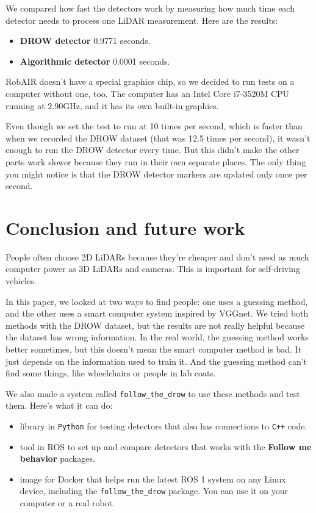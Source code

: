 \documentclass{article}
\begin{document}
We compared how fast the detectors work by measuring how much time each detector needs to process one LiDAR measurement.
Here are the results:

\begin{itemize}
	\item \textbf{DROW detector} 0.9771 seconds.
	\item \textbf{Algorithmic detector} 0.0001 seconds.
\end{itemize}

RobAIR doesn't have a special graphics chip, so we decided to run tests on a computer without one, too.
The computer has an Intel\textregistered{} Core\texttrademark{} i7-3520M CPU running at 2.90GHz, and it has its own built-in graphics.

Even though we set the test to run at 10 times per second, which is faster than when we recorded the DROW dataset (that was 12.5 times per second), it wasn't enough to run the DROW detector every time.
But this didn't make the other parts work slower because they run in their own separate places.
The only thing you might notice is that the DROW detector markers are updated only once per second.

\section{Conclusion and future work}

People often choose 2D LiDARs because they're cheaper and don't need as much computer power as 3D LiDARs and cameras\cite{2D_3D_lidars}.
This is important for self-driving vehicles.

In this paper, we looked at two ways to find people: one uses a guessing method, and the other uses a smart computer system inspired by VGGnet\cite{vggnet_paper}.
We tried both methods with the DROW dataset, but the results are not really helpful because the dataset has wrong information.
In the real world, the guessing method works better sometimes, but this doesn't mean the smart computer method is bad.
It just depends on the information used to train it.
And the guessing method can't find some things, like wheelchairs or people in lab coats.

We also made a system called \texttt{follow\_the\_drow} to use these methods and test them.
Here's what it can do:
\begin{itemize}
	\item library in \texttt{Python} for testing detectors that also has connections to \texttt{C++} code.
    \item tool in ROS to set up and compare detectors that works with the \textbf{Follow me behavior} packages.
	\item image for Docker that helps run the latest ROS 1 system on any Linux device, including the \texttt{follow\_the\_drow} package. You can use it on your computer or a real robot.
\end{itemize}
\end{document}

